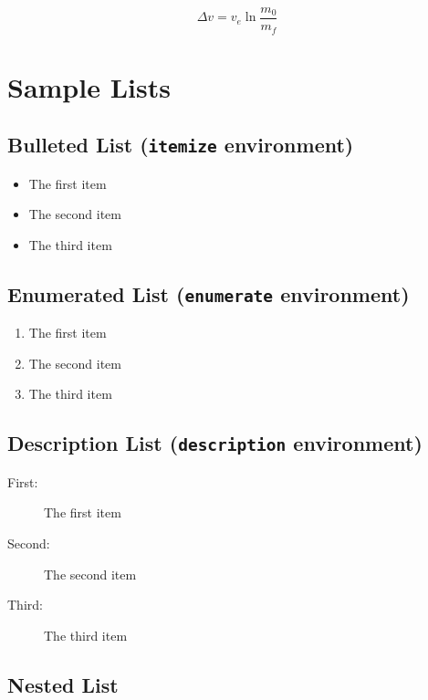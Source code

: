 \documentclass[]{nasa-latex-docs}
\begin{document}
\begin{equation} \label{eq:tsiolkovsky}
   \Delta v = v_e\ln\frac{m_0}{m_f}
\end{equation}

\section{Sample Lists}


\subsection{Bulleted List (\texttt{itemize} environment)}

\begin{itemize}
  \item The first item
  \item The second item
  \item The third item
\end{itemize}

\subsection{Enumerated List (\texttt{enumerate} environment)}

\begin{enumerate}
  \item The first item
  \item The second item
  \item The third item
\end{enumerate}

\subsection{Description List (\texttt{description} environment)}

\begin{description}
  \item[First:] The first item
  \item[Second:] The second item
  \item[Third:] The third item
\end{description}

\subsection{Nested List}
\end{document}
